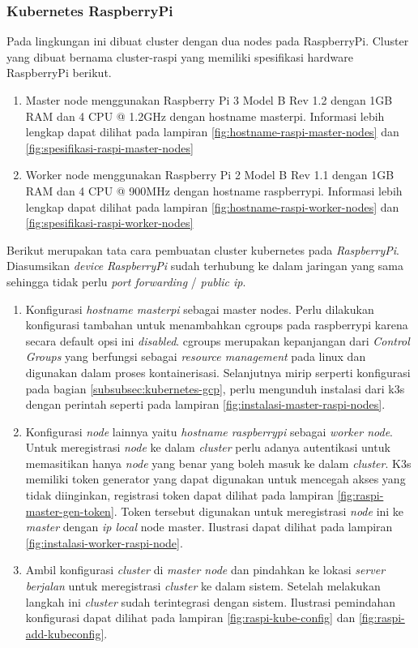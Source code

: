 \subsubsection{Kubernetes RaspberryPi}
Pada lingkungan ini dibuat cluster dengan dua nodes pada RaspberryPi. Cluster yang dibuat bernama cluster-raspi yang memiliki spesifikasi hardware RaspberryPi berikut.

\begin{enumerate}
  \item Master node menggunakan Raspberry Pi 3 Model B Rev 1.2 dengan 1GB RAM dan 4 CPU @ 1.2GHz dengan hostname masterpi. Informasi lebih lengkap dapat dilihat pada lampiran \ref{fig:hostname-raspi-master-nodes} dan \ref{fig:spesifikasi-raspi-master-nodes}
  \item Worker node menggunakan Raspberry Pi 2 Model B Rev 1.1 dengan 1GB RAM dan 4 CPU @ 900MHz dengan hostname raspberrypi. Informasi lebih lengkap dapat dilihat pada lampiran \ref{fig:hostname-raspi-worker-nodes} dan \ref{fig:spesifikasi-raspi-worker-nodes}
\end{enumerate}

Berikut merupakan tata cara pembuatan cluster kubernetes pada \textit{RaspberryPi}. Diasumsikan \textit{device} \textit{RaspberryPi} sudah terhubung ke dalam jaringan yang sama sehingga tidak perlu \textit{port forwarding} / \textit{public ip}.

\begin{enumerate}
  \item Konfigurasi \textit{hostname masterpi} sebagai master nodes. Perlu dilakukan konfigurasi tambahan untuk menambahkan cgroups pada raspberrypi karena secara default opsi ini \textit{disabled}. cgroups merupakan kepanjangan dari \textit{Control Groups} yang berfungsi sebagai \textit{resource management} pada linux dan digunakan dalam proses kontainerisasi. Selanjutnya mirip serperti konfigurasi pada bagian \ref{subsubsec:kubernetes-gcp}, perlu mengunduh instalasi dari k3s dengan perintah seperti pada lampiran \ref{fig:instalasi-master-raspi-nodes}.
  \item Konfigurasi \textit{node} lainnya yaitu \textit{hostname raspberrypi} sebagai \textit{worker node}. Untuk meregistrasi \textit{node} ke dalam \textit{cluster} perlu adanya autentikasi untuk memasitikan hanya \textit{node} yang benar yang boleh masuk ke dalam \textit{cluster}. K3s memiliki token generator yang dapat digunakan untuk mencegah akses yang tidak diinginkan, registrasi token dapat dilihat pada lampiran \ref{fig:raspi-master-gen-token}. Token tersebut digunakan untuk meregistrasi \textit{node} ini ke \textit{master} dengan \textit{ip local} node master. Ilustrasi dapat dilihat pada lampiran \ref{fig:instalasi-worker-raspi-node}.
  \item Ambil konfigurasi \textit{cluster} di \textit{master node} dan pindahkan ke lokasi \textit{server berjalan} untuk meregistrasi \textit{cluster} ke dalam sistem. Setelah melakukan langkah ini \textit{cluster} sudah terintegrasi dengan sistem. Ilustrasi pemindahan konfigurasi dapat dilihat pada lampiran \ref{fig:raspi-kube-config} dan \ref{fig:raspi-add-kubeconfig}.
\end{enumerate}